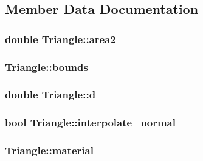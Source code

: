 \subsection{Member Data Documentation}
\subsubsection[{\texorpdfstring{area2}{area2}}]{\setlength{\rightskip}{0pt plus 5cm}double Triangle\+::area2\hspace{0.3cm}{\ttfamily [private]}}\hypertarget{classTriangle_a43322fb75910877dd63b17d391e3022b}{}\label{classTriangle_a43322fb75910877dd63b17d391e3022b}
\subsubsection[{\texorpdfstring{bounds}{bounds}}]{ Triangle\+::bounds\hspace{0.3cm}{\ttfamily [private]}}\hypertarget{classTriangle_ac5b18fe5f9ea12fb717e3306c300527d}{}\label{classTriangle_ac5b18fe5f9ea12fb717e3306c300527d}
\subsubsection[{\texorpdfstring{d}{d}}]{\setlength{\rightskip}{0pt plus 5cm}double Triangle\+::d\hspace{0.3cm}{\ttfamily [private]}}\hypertarget{classTriangle_a0cb5b18a8ce2cf896712cd3f9e6c80ea}{}\label{classTriangle_a0cb5b18a8ce2cf896712cd3f9e6c80ea}
\subsubsection[{\texorpdfstring{interpolate\+\_\+normal}{interpolate_normal}}]{\setlength{\rightskip}{0pt plus 5cm}bool Triangle\+::interpolate\+\_\+normal\hspace{0.3cm}{\ttfamily [private]}}\hypertarget{classTriangle_ac0fad333557f59ba9d9cafb8c16b203a}{}\label{classTriangle_ac0fad333557f59ba9d9cafb8c16b203a}
\subsubsection[{\texorpdfstring{material}{material}}]{ Triangle\+::material\hspace{0.3cm}{\ttfamily [private]}}\hypertarget{classTriangle_ae170999b9b35d778d9a0d084d256547b}{}\label{classTriangle_ae170999b9b35d778d9a0d084d256547b}
